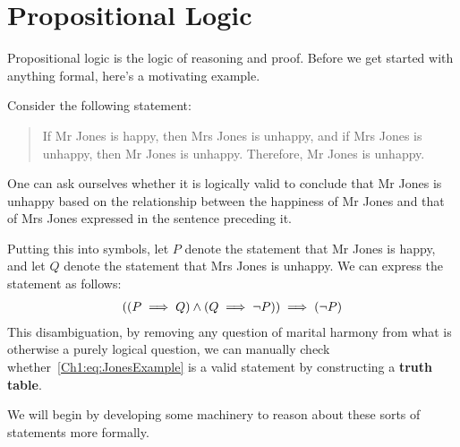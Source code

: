 
\chapter{Propositional Logic}\label{Ch1:CH}
\thispagestyle{empty}

Propositional logic is the logic of reasoning and proof. Before we get started with anything formal, here's a motivating example.

Consider the following statement:
\begin{quote}
    If Mr Jones is happy, then Mrs Jones is unhappy, and if Mrs Jones is unhappy, then Mr Jones is unhappy. Therefore, Mr Jones is unhappy.
\end{quote}
One can ask ourselves whether it is logically valid to conclude that Mr Jones is unhappy based on the relationship between the happiness of Mr Jones and that of Mrs Jones expressed in the sentence preceding it.

Putting this into symbols, let $P$ denote the statement that Mr Jones is happy, and let $Q$ denote the statement that Mrs Jones is unhappy. We can express the statement as follows:
\begin{align}
    \left( \left( P \implies Q \right) \land \left( Q \implies  \neg P \right) \right) \implies \left( \neg P \right)
    \label{Ch1:eq:JonesExample}
\end{align}
This disambiguation, by removing any question of marital harmony from what is otherwise a purely logical question, we can manually check whether~\eqref{Ch1:eq:JonesExample} is a valid statement by constructing a \textbf{truth table}.

We will begin by developing some machinery to reason about these sorts of statements more formally.


% 
% 
% 